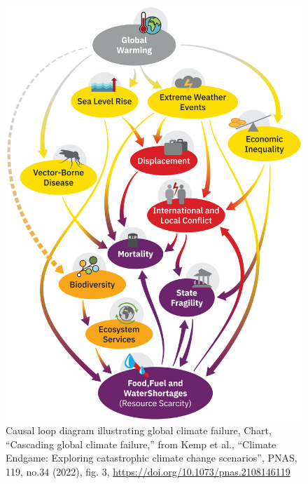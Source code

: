 \documentclass[12pt, a4paper, twoside]{article}
\begin{document}
\newpage

\begin{figure}[h!]
\centering
\includegraphics[width=0.9\linewidth]{pnas.2108146119fig03.jpg}
\caption{Causal loop diagram illustrating global climate failure, Chart, “Cascading global climate failure,” from Kemp et al., “Climate Endgame: Exploring catastrophic climate change scenarios”, PNAS, 119, no.34 (2022), fig. 3, \url{https://doi.org/10.1073/pnas.2108146119}}
\end{figure}

\newpage



\printbibliography[title=References]
\end{document}
